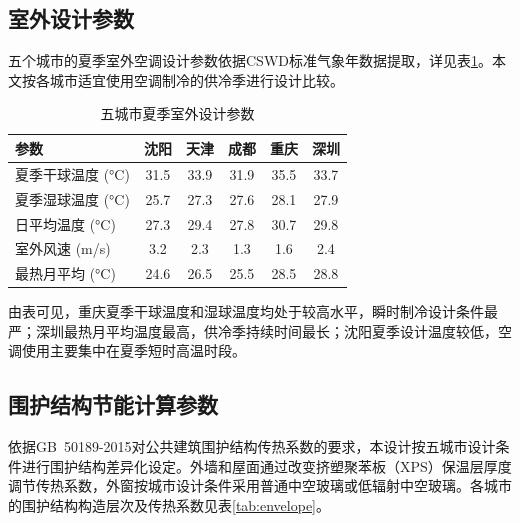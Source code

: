 \subsection{室外设计参数}

五个城市的夏季室外空调设计参数依据CSWD标准气象年数据提取，详见表\ref{tab:outdoor-params}。本文按各城市适宜使用空调制冷的供冷季进行设计比较。

\begin{table}[!htbp]
\centering
\caption{五城市夏季室外设计参数}
\label{tab:outdoor-params}
\begin{tabular}{@{}lccccc@{}}
\toprule
参数 & 沈阳 & 天津 & 成都 & 重庆 & 深圳 \\
\midrule
\midrule
夏季干球温度 (\si{\degreeCelsius}) & 31.5 & 33.9 & 31.9 & 35.5 & 33.7 \\
夏季湿球温度 (\si{\degreeCelsius}) & 25.7 & 27.3 & 27.6 & 28.1 & 27.9 \\
日平均温度 (\si{\degreeCelsius}) & 27.3 & 29.4 & 27.8 & 30.7 & 29.8 \\
室外风速 (\si{m/s}) & 3.2 & 2.3 & 1.3 & 1.6 & 2.4 \\
最热月平均 (\si{\degreeCelsius}) & 24.6 & 26.5 & 25.5 & 28.5 & 28.8 \\
\bottomrule
\end{tabular}
\end{table}

由表可见，重庆夏季干球温度和湿球温度均处于较高水平，瞬时制冷设计条件最严；深圳最热月平均温度最高，供冷季持续时间最长；沈阳夏季设计温度较低，空调使用主要集中在夏季短时高温时段。

\subsection{围护结构节能计算参数}

依据GB~50189-2015对公共建筑围护结构传热系数的要求，本设计按五城市设计条件进行围护结构差异化设定。外墙和屋面通过改变挤塑聚苯板（XPS）保温层厚度调节传热系数，外窗按城市设计条件采用普通中空玻璃或低辐射中空玻璃。各城市的围护结构构造层次及传热系数见表\ref{tab:envelope}。

